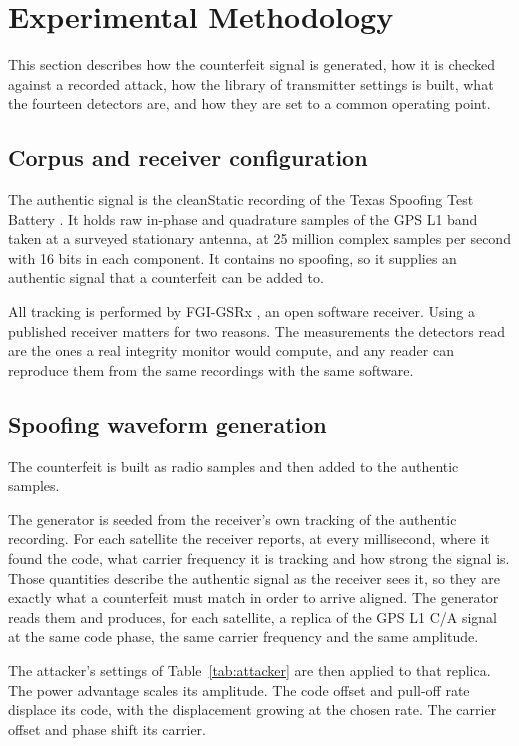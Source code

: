 \section{Experimental Methodology}
\label{sec:method}

This section describes how the counterfeit signal is generated, how it is checked
against a recorded attack, how the library of transmitter settings is built, what the
fourteen detectors are, and how they are set to a common operating point.

\subsection{Corpus and receiver configuration}
\label{sec:corpus}

The authentic signal is the cleanStatic recording of the Texas Spoofing Test Battery
\citep{humphreys2012texbat}. It holds raw in-phase and quadrature samples of the GPS L1
band taken at a surveyed stationary antenna, at 25 million complex samples per second
with 16 bits in each component. It contains no spoofing, so it supplies an authentic
signal that a counterfeit can be added to.

All tracking is performed by FGI-GSRx \citep{fgigsrx}, an open software receiver. Using
a published receiver matters for two reasons. The measurements the detectors read are
the ones a real integrity monitor would compute, and any reader can reproduce them from
the same recordings with the same software.

\subsection{Spoofing waveform generation}
\label{sec:generator}

The counterfeit is built as radio samples and then added to the authentic samples.

The generator is seeded from the receiver's own tracking of the authentic recording. For
each satellite the receiver reports, at every millisecond, where it found the code, what
carrier frequency it is tracking and how strong the signal is. Those quantities describe
the authentic signal as the receiver sees it, so they are exactly what a counterfeit
must match in order to arrive aligned. The generator reads them and produces, for each
satellite, a replica of the GPS L1 C/A signal at the same code phase, the same carrier
frequency and the same amplitude.

The attacker's settings of Table~\ref{tab:attacker} are then applied to that replica.
The power advantage scales its amplitude. The code offset and pull-off rate displace its
code, with the displacement growing at the chosen rate. The carrier offset and phase
shift its carrier.

